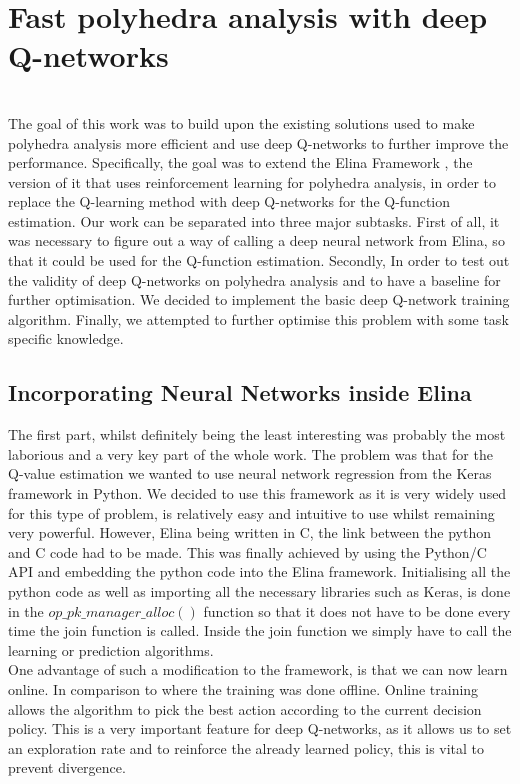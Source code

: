 
\chapter{Fast polyhedra analysis with deep Q-networks}
\mbox{}\\
The goal of this work was to build upon the existing solutions used to make polyhedra analysis more efficient and use deep Q-networks to further improve the performance. Specifically, the goal was to extend the Elina Framework \cite{elina}, the version of it that uses reinforcement learning for polyhedra analysis, in order to replace the Q-learning method with deep Q-networks for the Q-function estimation. Our work can be separated into three major subtasks. First of all, it was necessary to figure out a way of calling a deep neural network from Elina, so that it could be used for the Q-function estimation. Secondly, In order to test out the validity of deep Q-networks on polyhedra analysis and to have a baseline for further optimisation. We decided to implement the basic deep Q-network training algorithm. Finally, we attempted to further optimise this problem with some task specific knowledge.

\section{Incorporating Neural Networks inside Elina}
The first part, whilst definitely being the least interesting was probably the most laborious and a very key part of the whole work. The problem was that for the Q-value estimation we wanted to use neural network regression from the Keras framework in Python. We decided to use this framework as it is very widely used for this type of problem, is relatively easy and intuitive to use whilst remaining very powerful. However, Elina being written in C, the link between the python and C code had to be made. This was finally achieved  by using the Python/C API and embedding the python code into the Elina framework. Initialising all the python code as well as importing all the necessary libraries such as Keras, is done in the $op\_pk\_manager\_alloc()$ function so that it does not have to be done every time the join function is called. Inside the join function we simply have to call the learning or prediction algorithms.\\
One advantage of such a modification to the framework, is that we can now learn online. In comparison to \cite{singh2018fast} where the training was done offline. Online training allows the algorithm to pick the best action according to the current decision policy. This is a very important feature for deep Q-networks, as it allows us to set an exploration rate and to reinforce the already learned policy, this is vital to prevent divergence.
